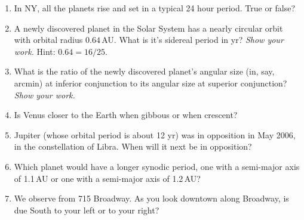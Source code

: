 \documentclass[12pt]{article}
\begin{document}
\begin{enumerate}
\item 
In NY, all the planets rise and set in a typical 24 hour period.  True
or false?

\vspace{0.5in}

\item 
A newly discovered planet in the Solar System has a nearly circular
orbit with orbital radius $0.64$\,AU.  What is it's sidereal period
in yr?  \emph{Show your work.}  Hint: $0.64=16/25$.

\vspace{1.5in}

\item
What is the ratio of the newly discovered planet's angular size (in,
say, arcmin) at inferior conjunction to its angular size at superior
conjunction?  \emph{Show your work.}

\vspace{1.5in}

\item 
Is Venus closer to the Earth when gibbous or when crescent?

\vspace{0.5in}

\item
Jupiter (whose orbital period is about 12 yr) was in opposition in May
2006, in the constellation of Libra.  When will it next be in
opposition?

\vspace{0.5in}

\item
Which planet would have a longer synodic period, one with a semi-major
axis of 1.1\,AU or one with a semi-major axis of 1.2\,AU?

\vspace{0.5in}

\item
We observe from 715 Broadway.  As you look downtown along Broadway, is
due South to your left or to your right?

\vspace{0.5in}

\end{enumerate}
\end{document}
